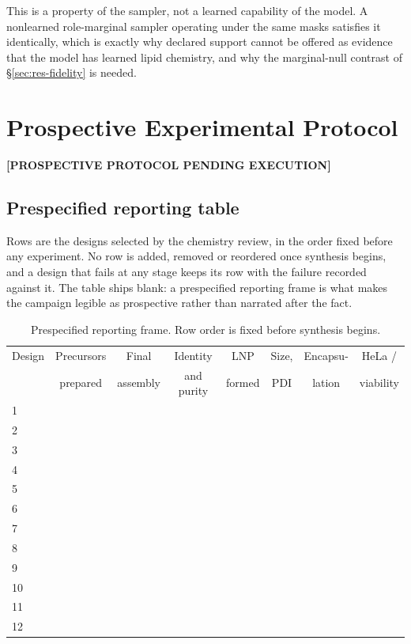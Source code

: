 \documentclass{article}
\newcommand{\PENDING}[1]{\textbf{[#1]}}
\begin{document}
This is a property of the sampler, not a learned capability of the model. A nonlearned role-marginal
sampler operating under the same masks satisfies it identically, which is exactly why declared
support cannot be offered as evidence that the model has learned lipid chemistry, and why the
marginal-null contrast of \S\ref{sec:res-fidelity} is needed.

\section{Prospective Experimental Protocol}
\label{app:prospective}
\PENDING{PROSPECTIVE PROTOCOL PENDING EXECUTION}

\subsection{Prespecified reporting table}
\label{app:reporting-skeleton}
Rows are the designs selected by the chemistry review, in the order fixed before any experiment.
No row is added, removed or reordered once synthesis begins, and a design that fails at any stage
keeps its row with the failure recorded against it. The table ships blank: a prespecified reporting
frame is what makes the campaign legible as prospective rather than narrated after the fact.

\begin{table}[h]
\centering
\caption{Prespecified reporting frame. Row order is fixed before synthesis begins.}
\label{tab:reporting-frame}
\scriptsize
\begin{tabular}{@{}lccccccc@{}}
\toprule
Design & Precursors & Final & Identity & LNP & Size, & Encapsu- & HeLa / \\
       & prepared   & assembly & and purity & formed & PDI & lation & viability \\
\midrule
1 & & & & & & & \\
2 & & & & & & & \\
3 & & & & & & & \\
4 & & & & & & & \\
5 & & & & & & & \\
6 & & & & & & & \\
7 & & & & & & & \\
8 & & & & & & & \\
9 & & & & & & & \\
10 & & & & & & & \\
11 & & & & & & & \\
12 & & & & & & & \\
\bottomrule
\end{tabular}
\end{table}
\end{document}
